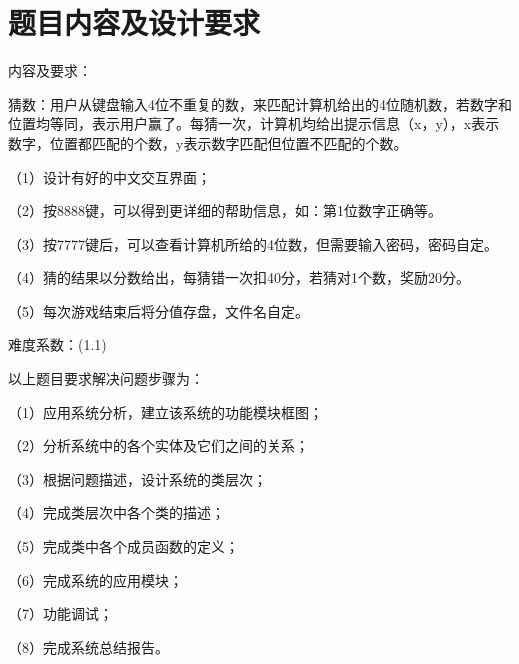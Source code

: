 \section{题目内容及设计要求}

内容及要求：

猜数：用户从键盘输入4位不重复的数，来匹配计算机给出的4位随机数，若数字和位置均等同，表示用户赢了。每猜一次，计算机均给出提示信息（x，y），x表示数字，位置都匹配的个数，y表示数字匹配但位置不匹配的个数。

（1）设计有好的中文交互界面；

（2）按8888键，可以得到更详细的帮助信息，如：第1位数字正确等。

（3）按7777键后，可以查看计算机所给的4位数，但需要输入密码，密码自定。

（4）猜的结果以分数给出，每猜错一次扣40分，若猜对1个数，奖励20分。

（5）每次游戏结束后将分值存盘，文件名自定。


难度系数：(1.1)


以上题目要求解决问题步骤为：

（1）应用系统分析，建立该系统的功能模块框图；

（2）分析系统中的各个实体及它们之间的关系；

（3）根据问题描述，设计系统的类层次；

（4）完成类层次中各个类的描述；

（5）完成类中各个成员函数的定义；

（6）完成系统的应用模块；

（7）功能调试；

（8）完成系统总结报告。
